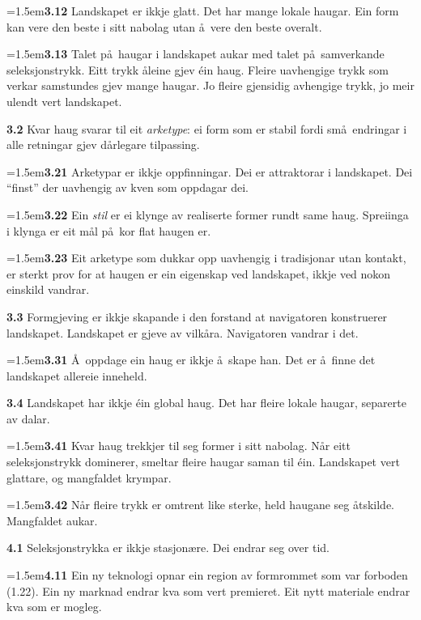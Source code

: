 \documentclass[11pt, a4paper]{article}
\newcommand{\prop}[1]{\bigskip\noindent{\Large\textbf{#1}}\medskip\par}
\newcommand{\subprop}[1]{\medskip\noindent\textbf{#1}\quad}
\newcommand{\subsubprop}[1]{\smallskip\hangindent=1.5em\noindent\hspace{1.5em}\textbf{#1}\quad}
\begin{document}
\subsubprop{3.12} Landskapet er ikkje glatt. Det har mange lokale haugar. Ein form kan vere den beste i sitt nabolag utan \aa\ vere den beste overalt.

\subsubprop{3.13} Talet p\aa\ haugar i landskapet aukar med talet p\aa\ samverkande seleksjonstrykk. Eitt trykk \aa leine gjev \'ein haug. Fleire uavhengige trykk som verkar samstundes gjev mange haugar. Jo fleire gjensidig avhengige trykk, jo meir ulendt vert landskapet.

\subprop{3.2} Kvar haug svarar til eit \textit{arketype}: ei form som er stabil fordi sm\aa\ endringar i alle retningar gjev d\aa rlegare tilpassing.

\subsubprop{3.21} Arketypar er ikkje oppfinningar. Dei er attraktorar i landskapet. Dei ``finst'' der uavhengig av kven som oppdagar dei.

\subsubprop{3.22} Ein \textit{stil} er ei klynge av realiserte former rundt same haug. Spreiinga i klynga er eit m\aa l p\aa\ kor flat haugen er.

\subsubprop{3.23} Eit arketype som dukkar opp uavhengig i tradisjonar utan kontakt, er sterkt prov for at haugen er ein eigenskap ved landskapet, ikkje ved nokon einskild vandrar.

\subprop{3.3} Formgjeving er ikkje skapande i den forstand at navigatoren konstruerer landskapet. Landskapet er gjeve av vilk\aa ra. Navigatoren vandrar i det.

\subsubprop{3.31} \AA\ oppdage ein haug er ikkje \aa\ skape han. Det er \aa\ finne det landskapet allereie inneheld.

\subprop{3.4} Landskapet har ikkje \'ein global haug. Det har fleire lokale haugar, separerte av dalar.

\subsubprop{3.41} Kvar haug trekkjer til seg former i sitt nabolag. N\aa r eitt seleksjonstrykk dominerer, smeltar fleire haugar saman til \'ein. Landskapet vert glattare, og mangfaldet krympar.

\subsubprop{3.42} N\aa r fleire trykk er omtrent like sterke, held haugane seg \aa tskilde. Mangfaldet aukar.

\prop{4 Landskapet er i r\o rsle.}

\subprop{4.1} Seleksjonstrykka er ikkje stasjon\ae re. Dei endrar seg over tid.

\subsubprop{4.11} Ein ny teknologi opnar ein region av formrommet som var forboden (1.22). Ein ny marknad endrar kva som vert premieret. Eit nytt materiale endrar kva som er mogleg.
\end{document}
